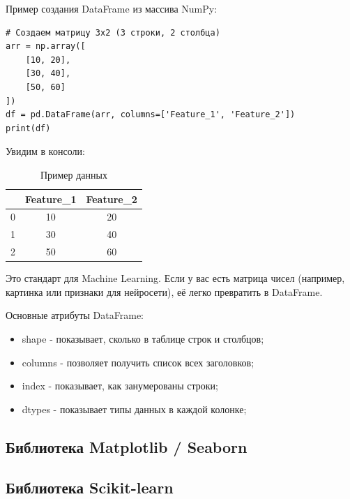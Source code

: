 \documentclass[pract]{SCWorks}
\begin{document}
Пример создания DataFrame из массива NumPy:

\begin{verbatim}
# Создаем матрицу 3x2 (3 строки, 2 столбца)
arr = np.array([
    [10, 20],
    [30, 40],
    [50, 60]
])
df = pd.DataFrame(arr, columns=['Feature_1', 'Feature_2'])
print(df)
\end{verbatim}
Увидим в консоли:

\begin{table}[H]
\centering
\caption{Пример данных}
\begin{tabular}{c c c}
\hline
& \textbf{Feature\_1} & \textbf{Feature\_2} \\ \hline
0 & 10 & 20 \\ \hline
1 & 30 & 40 \\ \hline
2 & 50 & 60 \\ \hline
\end{tabular}
\end{table}



Это стандарт для Machine Learning. Если у вас есть матрица чисел (например, картинка или 
признаки для нейросети), её легко превратить в DataFrame.

Основные атрибуты DataFrame:

\begin{itemize}
    \item shape - показывает, сколько в таблице строк и столбцов;
    \item columns - позволяет получить список всех заголовков;
    \item index - показывает, как занумерованы строки;
    \item dtypes - показывает типы данных в каждой колонке;
\end{itemize}










\subsection{Библиотека Matplotlib / Seaborn}

\subsection{Библиотека Scikit-learn}

\conclusion





\appendix
\end{document}

